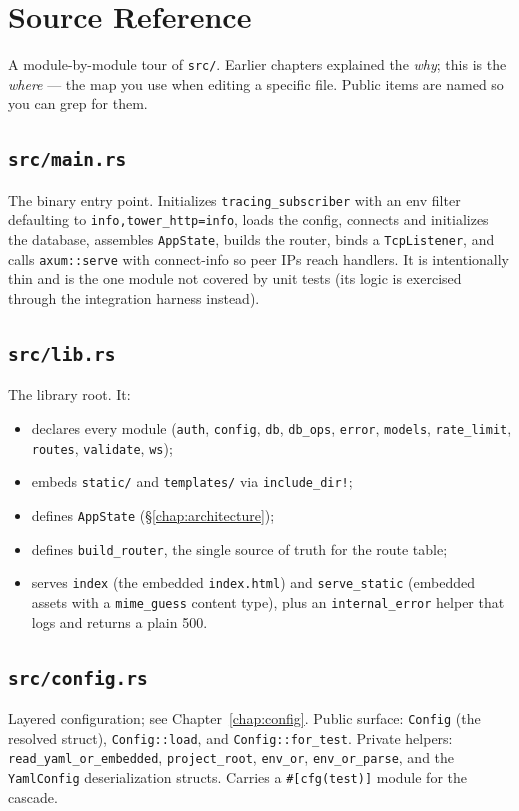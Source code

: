 \chapter{Source Reference}
\label{chap:source}

A module-by-module tour of \verb|src/|. Earlier chapters explained the
\emph{why}; this is the \emph{where} --- the map you use when editing a specific
file. Public items are named so you can grep for them.

\section{\texttt{src/main.rs}}
The binary entry point. Initializes \verb|tracing_subscriber| with an env filter
defaulting to \verb|info,tower_http=info|, loads the config, connects and
initializes the database, assembles \verb|AppState|, builds the router, binds a
\verb|TcpListener|, and calls \verb|axum::serve| with connect-info so peer IPs
reach handlers. It is intentionally thin and is the one module not covered by
unit tests (its logic is exercised through the integration harness instead).

\section{\texttt{src/lib.rs}}
The library root. It:
\begin{itemize}
  \item declares every module (\verb|auth|, \verb|config|, \verb|db|,
        \verb|db_ops|, \verb|error|, \verb|models|, \verb|rate_limit|,
        \verb|routes|, \verb|validate|, \verb|ws|);
  \item embeds \verb|static/| and \verb|templates/| via \verb|include_dir!|;
  \item defines \verb|AppState| (\S\ref{chap:architecture});
  \item defines \verb|build_router|, the single source of truth for the route
        table;
  \item serves \verb|index| (the embedded \verb|index.html|) and
        \verb|serve_static| (embedded assets with a \verb|mime_guess| content
        type), plus an \verb|internal_error| helper that logs and returns a plain
        500.
\end{itemize}

\section{\texttt{src/config.rs}}
Layered configuration; see Chapter~\ref{chap:config}. Public surface:
\verb|Config| (the resolved struct), \verb|Config::load|, and
\verb|Config::for_test|. Private helpers: \verb|read_yaml_or_embedded|,
\verb|project_root|, \verb|env_or|, \verb|env_or_parse|, and the \verb|YamlConfig|
deserialization structs. Carries a \verb|#[cfg(test)]| module for the cascade.

